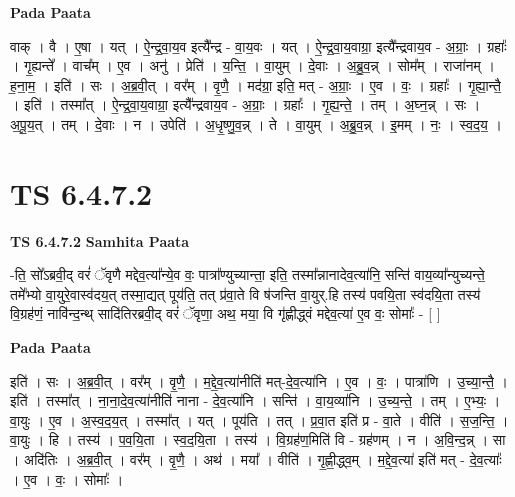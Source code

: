 \documentclass[17pt]{extarticle}
\begin{document}
\textbf{Pada Paata} \newline

वाक् । वै । ए॒षा । यत् । ऐ॒न्द्र॒वा॒य॒व इत्यै᳚न्द्र - वा॒य॒वः । यत् । ऐ॒न्द्र॒वा॒य॒वाग्रा॒ इत्यै᳚न्द्रवाय॒व - अ॒ग्राः॒ । ग्रहाः᳚ । गृ॒ह्यन्ते᳚ । वाच᳚म् । ए॒व । अनु॑ । प्रेति॑ । य॒न्ति॒ । वा॒युम् । दे॒वाः । अ॒ब्रु॒व॒न्न् । सोम᳚म् । राजा॑नम् । ह॒ना॒म॒ । इति॑ । सः । अ॒ब्र॒वी॒त् । वर᳚म् । वृ॒णै॒ । मद॑ग्रा॒ इति॒ मत् - अ॒ग्राः॒ । ए॒व । वः॒ । ग्रहाः᳚ । गृ॒ह्या॒न्तै॒ । इति॑ । तस्मा᳚त् । ऐ॒न्द्र॒वा॒य॒वाग्रा॒ इत्यै᳚न्द्रवाय॒व - अ॒ग्राः॒ । ग्रहाः᳚ । गृ॒ह्य॒न्ते॒ । तम् । अ॒घ्न॒न्न् । सः । अ॒पू॒य॒त् । तम् । दे॒वाः । न । उपेति॑ । अ॒धृ॒ष्णु॒व॒न्न् । ते । वा॒युम् । अ॒ब्रु॒व॒न्न् । इ॒मम् । नः॒ । स्व॒द॒य॒ ।  \newline




\section*{ TS 6.4.7.2 }

\textbf{TS 6.4.7.2 } \newline
\textbf{Samhita Paata} \newline

-ति॒ सो᳚ऽब्रवी॒द् वरं॑ ॅवृणै मद्देव॒त्या᳚न्ये॒व वः॒ पात्रा᳚ण्युच्यान्ता॒ इति॒ तस्मा᳚न्नानादेव॒त्या॑नि॒ सन्ति॑ वाय॒व्या᳚न्युच्यन्ते॒ तमे᳚भ्यो वा॒युरे॒वास्व॑दय॒त् तस्मा॒द्यत् पूय॑ति॒ तत् प्र॑वा॒ते वि ष॑जन्ति वा॒युर्.हि तस्य॑ पवयि॒ता स्व॑दयि॒ता तस्य॑ वि॒ग्रह॑णं॒ नावि॑न्द॒न्थ् सादि॑तिरब्रवी॒द् वरं॑ ॅवृणा॒ अथ॒ मया॒ वि गृ॑ह्णीद्ध्वं मद्देव॒त्या॑ ए॒व वः॒ सोमाः᳚ - [  ] \newline

\textbf{Pada Paata} \newline

इति॑ । सः । अ॒ब्र॒वी॒त् । वर᳚म् । वृ॒णै॒ । म॒द्दे॒व॒त्या॑नीति॑ मत्-दे॒व॒त्या॑नि । ए॒व । वः॒ । पात्रा॑णि । उ॒च्या॒न्तै॒ । इति॑ । तस्मा᳚त् । ना॒ना॒दे॒व॒त्या॑नीति॑ नाना - दे॒व॒त्या॑नि । सन्ति॑ । वा॒य॒व्या॑नि । उ॒च्य॒न्ते॒ । तम् । ए॒भ्यः॒ । वा॒युः । ए॒व । अ॒स्व॒द॒य॒त् । तस्मा᳚त् । यत् । पूय॑ति । तत् । प्र॒वा॒त इति॑ प्र - वा॒ते । वीति॑ । स॒ज॒न्ति॒ । वा॒युः । हि । तस्य॑ । प॒व॒यि॒ता । स्व॒द॒यि॒ता । तस्य॑ । वि॒ग्रह॑ण॒मिति॑ वि - ग्रह॑णम् । न । अ॒वि॒न्द॒न्न् । सा । अदि॑तिः । अ॒ब्र॒वी॒त् । वर᳚म् । वृ॒णै॒ । अथ॑ । मया᳚ । वीति॑ । गृ॒ह्णी॒द्ध्व॒म् । म॒द्दे॒व॒त्या॑ इति॑ मत् - दे॒व॒त्याः᳚ । ए॒व । वः॒ । सोमाः᳚ ।  \newline
\end{document}
